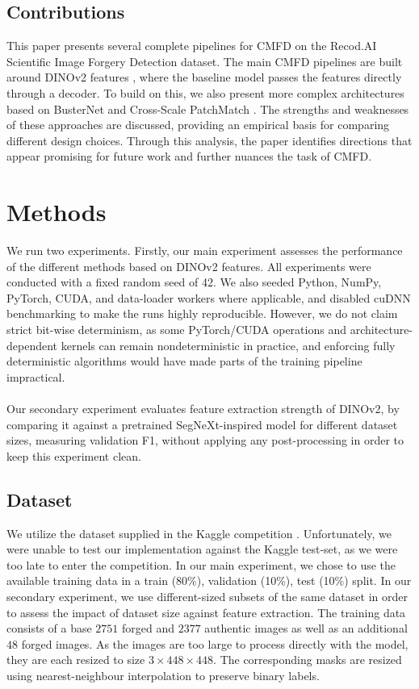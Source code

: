 \documentclass[final]{nldl}
\begin{document}
\subsection{Contributions}
This paper presents several complete pipelines for CMFD on the Recod.AI Scientific Image Forgery Detection dataset. The main CMFD pipelines are built around DINOv2 features \cite{oquab2023dinov2}, where the baseline model passes the features directly through a decoder. To build on this, we also present more complex architectures based on BusterNet \cite{wu2018busternet} and Cross-Scale PatchMatch \cite{li2024deeppatchmatch}. The strengths and weaknesses of these approaches are discussed, providing an empirical basis for comparing different design choices. Through this analysis, the paper identifies directions that appear promising for future work and further nuances the task of CMFD.
\section{Methods}
We run two experiments. Firstly, our main experiment assesses the performance of the different methods based on DINOv2 features. All experiments were conducted with a fixed random seed of 42. We also seeded Python, NumPy, PyTorch, CUDA, and data-loader workers where applicable, and disabled cuDNN benchmarking to make the runs highly reproducible. However, we do not claim strict bit-wise determinism, as some PyTorch/CUDA operations and architecture-dependent kernels can remain nondeterministic in practice, and enforcing fully deterministic algorithms would have made parts of the training pipeline impractical.
\\\\
Our secondary experiment evaluates feature extraction strength of DINOv2, by comparing it against a pretrained SegNeXt-inspired model for different dataset sizes, measuring validation F1, without applying any post-processing in order to keep this experiment clean.
\subsection{Dataset}
We utilize the dataset supplied in the Kaggle competition \cite{kaggle}. Unfortunately, we were unable to test our implementation against the Kaggle test-set, as we were too late to enter the competition. In our main experiment, we chose to use the available training data in a train (80\%), validation (10\%), test (10\%) split. In our secondary experiment, we use different-sized subsets of the same dataset in order to assess the impact of dataset size against feature extraction. The training data consists of a base $2751$ forged and $2377$ authentic images as well as an additional $48$ forged images. As the images are too large to process directly with the model, they are each resized to size $3 \times 448 \times 448$. The corresponding masks are resized using nearest-neighbour interpolation to preserve binary labels.
\end{document}
